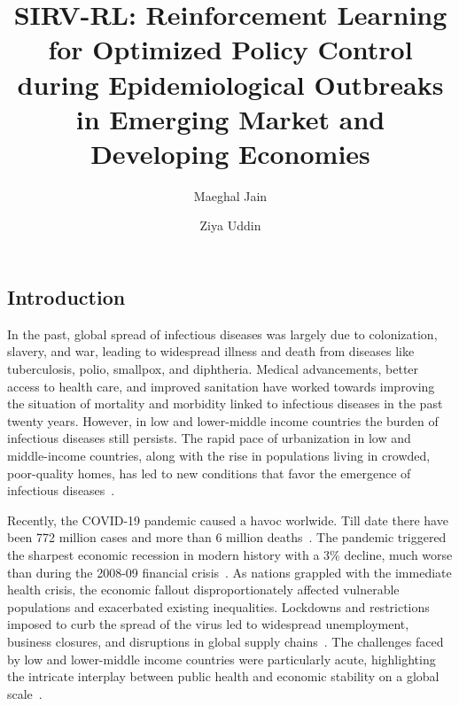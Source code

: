 \documentclass[tikz,fleqn,12pt]{wlscirep}
\title{SIRV-RL: Reinforcement Learning for Optimized Policy Control during Epidemiological Outbreaks in Emerging Market and Developing Economies}
\author[1,*]{Maeghal Jain}
\author[1]{Ziya Uddin}
\affil[1]{BML Munjal University}
\affil[*]{e-mail: maeghaljain@gmail.com}
\begin{document}
\flushbottom
\maketitle
\thispagestyle{empty}
\subsection*{Introduction}
In the past, global spread of infectious diseases was largely due to colonization, slavery, and war, leading to widespread illness and death from diseases like tuberculosis, polio, smallpox, and diphtheria. Medical advancements, better access to health care, and improved sanitation have worked towards improving the situation of mortality and morbidity linked to infectious diseases in the past twenty years. However, in low and lower-middle income countries the burden of infectious diseases still persists. The rapid pace of urbanization in low and middle-income countries, along with the rise in populations living in crowded, poor-quality homes, has led to new conditions that favor the emergence of infectious diseases~\cite{Baker2022, inequitableworld}.

Recently, the COVID-19 pandemic caused a havoc worlwide. Till date there have been 772 million cases and more than 6 million deaths~\cite{WHOCovid}. The pandemic triggered the sharpest economic recession in modern history with a 3\% decline, much worse than during the 2008-09 financial crisis~\cite{IMFCovid}. As nations grappled with the immediate health crisis, the economic fallout disproportionately affected vulnerable populations and exacerbated existing inequalities. Lockdowns and restrictions imposed to curb the spread of the virus led to widespread unemployment, business closures, and disruptions in global supply chains~\cite{Nicola2020}. The challenges faced by low and lower-middle income countries were particularly acute, highlighting the intricate interplay between public health and economic stability on a global scale~\cite{Gagnon2023}. 
\end{document}
